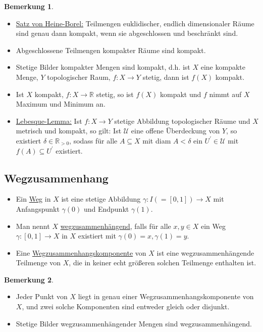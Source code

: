 \documentclass[a4paper,11pt,notitlepage]{report}
\theoremstyle{definition}
\newtheorem{remark}{Bemerkung}[chapter]
\newcommand{\R}{{\ensuremath{\mathbb{R}}}}
\begin{document}
\begin{remark}
	\begin{itemize}
		\item \underline{Satz von Heine-Borel:} Teilmengen euklidischer, endlich dimensionaler Räume sind genau dann kompakt, wenn sie abgeschlossen und beschränkt sind.
		\item Abgeschlossene Teilmengen kompakter Räume sind kompakt.
		\item Stetige Bilder kompakter Mengen sind kompakt, d.h. ist $X$ eine kompakte Menge, $Y$ topologischer Raum, $f \colon X \rightarrow Y$ stetig, dann ist $f(X)$ kompakt.
		\item Ist $X$ kompakt, $f \colon X \rightarrow \R$ stetig, so ist $f(X)$ kompakt und $f$ nimmt auf $X$ Maximum und Minimum an.
		\item \underline{Lebesque-Lemma:} Ist $f \colon X \rightarrow Y$ stetige Abbildung topologischer Räume und $X$ metrisch und kompakt, so gilt:
		\newline
			Ist $\mathcal{U}$ eine offene Überdeckung von $Y$, so existiert $\delta \in \R_{>0}$, sodass für alle $A \subseteq X$ mit diam $A < \delta$ ein $U^\prime \in \mathcal{U}$ mit $f(A) \subseteq U^\prime$ existiert.
	\end{itemize}
\end{remark}

\subsection{Wegzusammenhang}
\begin{definition}
	\begin{itemize}
		\item Ein \underline{Weg} in $X$ ist eine stetige Abbildung $\gamma \colon I(=[0,1]) \rightarrow X$ mit Anfangspunkt $\gamma(0)$ und Endpunkt $\gamma(1)$.	
		\item Man nennt $X$ \underline{wegzusammenhängend}, falls für alle $x,y \in X$ ein Weg $\gamma \colon [0,1] \rightarrow X$ in $X$ existiert mit $\gamma(0)=x, \gamma(1)=y$.
		\item Eine \underline{Wegzusammenhangskomponente} von $X$ ist eine wegzusammenhängende Teilmenge von $X$, die in keiner echt größeren solchen Teilmenge enthalten ist.
	\end{itemize}
\end{definition}

\begin{remark}
	\begin{itemize}
		\item Jeder Punkt von $X$ liegt in genau einer Wegzusammenhangskomponente von $X$, und zwei solche Komponenten sind entweder gleich oder disjunkt.
		\item Stetige Bilder wegzusammenhängender Mengen sind wegzusammenhängend.
	\end{itemize}
\end{remark}
\end{document}
